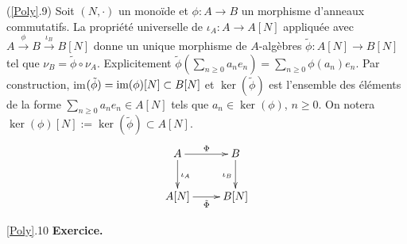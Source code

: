 \documentclass[a4paper, oneside, 12pt]{book}
\theoremstyle{theoremeStyle} %
\theoremstyle{definition} %
\begin{document}
  (\ref{Poly}.9)  Soit $(N,\cdot)$ un monoïde et $\phi: A\rightarrow B$ un morphisme d'anneaux commutatifs. La propriété universelle de $\iota_A:A\rightarrow A[N]$ appliquée avec $A\stackrel{\phi}{\rightarrow} B\stackrel{\iota_B}{\rightarrow} B[N]$ donne un unique morphisme de $A$-algèbres $\tilde{\phi}:A[N]\rightarrow B[N]$ tel que $\nu_B=\tilde{\phi}\circ \nu_A$. Explicitement $\tilde{\phi}(\sum_{n\geq 0}a_ne_n)=\sum_{n\geq 0}\phi(a_n)e_n$.  Par construction, im$(\tilde{\phi})=\hbox{\rm im}(\phi)[N]\subset B[N]$ et $\ker(\tilde{\phi})$ est l'ensemble des éléments de la forme $\sum_{n\geq 0}a_ne_n\in A[N]$ tels que $a_n\in \ker(\phi)$, $n\geq 0$. On notera $\ker(\phi)[N]:=\ker(\tilde{\phi})\subset A[N]$.\\

	$$ \xymatrix{ A\ar[r]^\Phi \ar[d]^{\iota_A} & B \ar[d]_{\iota_B} \\ A[N]\ar[r]_{\tilde{\Phi} } & B[N] } $$

 \ref{Poly}.10 \textbf{Exercice.} \\
\end{document}
